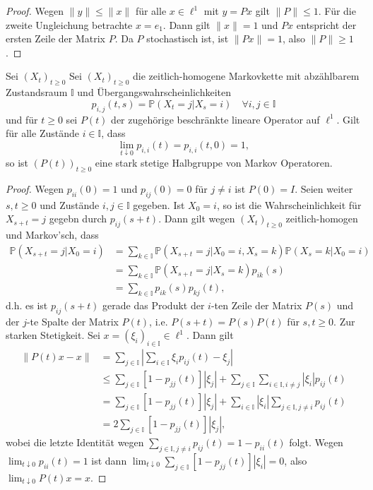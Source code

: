 \begin{proof}
Wegen $\|y\|\leq \|x\|$ für alle $x\in\ell^1$ mit $y=Px$ gilt $\|P\|\leq 1$. Für die zweite Ungleichung betrachte $x=e_1$. Dann gilt $\|x\|=1$ und $Px$ entspricht der ersten Zeile der Matrix $P$. Da $P$ stochastisch ist, ist $\|Px\|=1$, also $\|P\|\geq 1$. 
\end{proof}


\begin{prop}
   Sei $(X_t)_{t\geq0}$ Sei $(X_t)_{t\geq0}$ die zeitlich-homogene Markovkette  mit abzählbarem Zustandsraum $\mathbb I$ und Übergangswahrscheinlichkeiten $$p_{i,j}(t,s)=\mathbb P(X_t=j| X_s=i)\quad \forall i,j\in \mathbb I$$ und für $t\geq0$ sei $P(t)$ der zugehörige beschränkte lineare Operator auf $\ell^1$. Gilt für alle Zustände $i\in\mathbb I$, dass $$\lim_{t\downarrow 0}p_{i,i}(t)=p_{i,i}(t,0)=1,$$so ist $(P(t))_{t\geq0}$ eine stark stetige Halbgruppe von Markov Operatoren.
\end{prop}

\begin{proof}
  Wegen $p_{ii}(0)=1$ und $p_{ij}(0)=0$ für $j\neq i$ ist $P(0)=I$.  Seien weiter $s,t\geq0$ und Zustände $i,j\in\mathbb I$ gegeben. Ist $X_0=i$, so ist die Wahrscheinlichkeit für $X_{s+t}=j$ gegebn durch $p_{ij}(s+t)$. Dann gilt wegen $(X_t)_{t\geq0}$ zeitlich-homogen und Markov'sch, dass
  \begin{align}
  \mathbb P(X_{s+t}=j|X_0=i)
  &=\sum_{k\in\mathbb I}\mathbb P(X_{s+t}=j|X_0=i, X_s=k)\mathbb P(X_s=k|X_0=i)\\
  &=\sum_{k\in\mathbb I}\mathbb P(X_{s+t}=j|X_s=k)p_{ik}(s)\\
  &=\sum_{k\in\mathbb I}p_{ik}(s)p_{kj}(t),
  \end{align}
  d.h. es ist $p_{ij}(s+t)$ gerade das Produkt der $i$-ten Zeile der Matrix $P(s)$ und der $j$-te Spalte der Matrix $P(t)$, i.e. $P(s+t)=P(s)P(t)$ für $s,t\geq0$. Zur starken Stetigkeit. Sei $x=(\xi_i)_{i\in\mathbb I}\in\ell^1$. Dann gilt
  \begin{align}
    \|P(t)x-x\|
    &=\sum_{j\in\mathbb I}|\sum_{i\in\mathbb I}\xi_i p_{ij}(t)-\xi_j|\\
    &\leq \sum_{j\in\mathbb I}[1-p_{jj}(t)]|\xi_j|+\sum_{j\in\mathbb I}\sum_{i\in\mathbb I,i\neq j}|\xi_i|p_{ij}(t)\\
    &=\sum_{j\in\mathbb I}[1-p_{jj}(t)]|\xi_j|+\sum_{i\in\mathbb I}|\xi_i|\sum_{j\in\mathbb I,j\neq i}p_{ij}(t)\\
    &=2\sum_{j\in\mathbb I}[1-p_{jj}(t)]|\xi_j|,
  \end{align}
  wobei die letzte Identität wegen $\sum_{j\in\mathbb I,j\neq i}p_{ij}(t)=1-p_{ii}(t)$ folgt. Wegen $\lim_{t\downarrow 0}p_{ii}(t)=1$ ist dann $\lim_{t\downarrow 0}\sum_{j\in\mathbb I}[1-p_{jj}(t)]|\xi_i|=0$, also $\lim_{t\downarrow 0}P(t)x=x$.
\end{proof}


